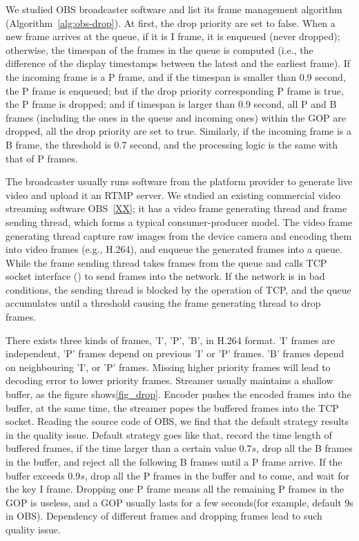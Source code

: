 We studied OBS broadcaster software and list its frame management algorithm (Algorithm~\ref{alg:obs-drop}). At first, the drop priority are set to false. When a new frame arrives at the queue, if it is I frame, it is enqueued (never dropped); otherwise, the timespan of the frames in the queue is computed (i.e., the difference of the display timestamps between the latest and the earliest frame). If the incoming frame is a P frame, and if the timespan is smaller than 0.9 second, the P frame is enqueued; but if the drop priority corresponding P frame is true, the P frame is dropped; and if timespan is larger than 0.9 second, all P and B frames (including the ones in the queue and incoming ones) within the GOP are dropped, all the drop priority are set to true. Similarly, if the incoming frame is a B frame, the threshold is 0.7 second, and the processing logic is the same with that of P frames.

\iffalse

The broadcaster usually runs software from the platform provider to generate live video and upload it an RTMP server. We studied an existing commercial video streaming software OBS~\ref{XX}; it has a video frame generating thread and frame sending thread, which forms a typical consumer-producer model. The video frame generating thread capture raw images from the device camera and encoding them into video frames (e.g., H.264), and enqueue the generated frames into a queue. While the frame sending thread takes frames from the queue and calls TCP socket interface (\mywrite) to send frames into the network. If the network is in bad conditions, the sending thread is blocked by the \mywrite operation of TCP, and the queue accumulates until a threshold causing the frame generating thread to drop frames.


There exists three kinds of frames, 'I', 'P', 'B', in H.264 format. 'I' frames are independent, 'P' frames depend on previous 'I' or 'P' frames. 'B' frames depend on neighbouring 'I', or 'P' frames. Missing higher priority frames will lead to decoding error to lower priority frames.
Streamer usually maintains a shallow buffer, as the figure shows\ref{fig_drop}. Encoder pushes the encoded frames into the buffer, at the same time, the streamer popes the buffered frames into the TCP socket. Reading the source code of OBS, we find that the default strategy results in the quality issue. Default strategy goes like that, record the time length of buffered frames, if the time larger than a certain value $0.7s$, drop all the B frames in the buffer, and reject all the following B frames until a P frame arrive. If the buffer exceeds $0.9s$, drop all the P frames in the buffer and to come, and wait for the key I frame. Dropping one P frame means all the remaining P frames in the GOP is useless, and a GOP usually lasts for a few seconds(for example, default 9s in OBS). Dependency of different frames and dropping frames lead to such quality issue.

